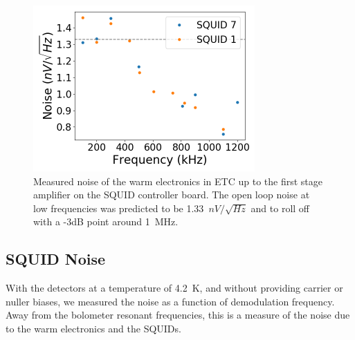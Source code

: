 \begin{figure}[ht!]
\begin{center}
\includegraphics[height=2.5in]{figures/warm_electronic_noise.png}
\caption{Measured noise of the warm electronics in \ac{ETC} up to the first stage amplifier on the \ac{SQUID} controller board. The open loop noise at low frequencies was predicted to be 1.33~$nV/\sqrt{Hz}$ and to roll off with a -3dB point around 1~MHz. 
\label{fig:dark_electronic_noise} }
\end{center}
\end{figure}




\subsection{SQUID Noise}
\label{sec:procedure}

With the detectors at a temperature of 4.2~K, and without providing carrier or nuller biases, we measured the noise as a function of demodulation frequency. 
Away from the bolometer resonant frequencies, this is a measure of the noise due to the warm electronics and the \ac{SQUID}s. 

